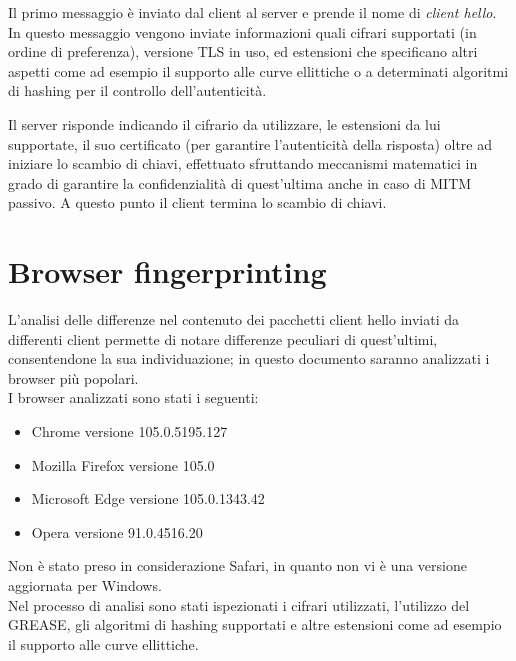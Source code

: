 Il primo messaggio è inviato dal client al server e prende il nome di \textit{client hello}. In questo messaggio vengono inviate informazioni quali cifrari supportati (in ordine di preferenza), versione TLS in uso, ed estensioni che specificano altri aspetti come ad esempio il supporto alle curve ellittiche o a determinati algoritmi di hashing per il controllo dell'autenticità.

Il server risponde indicando il cifrario da utilizzare, le estensioni da lui supportate, il suo certificato (per garantire l'autenticità della risposta) oltre ad iniziare lo scambio di chiavi, effettuato sfruttando meccanismi matematici in grado di garantire la confidenzialità di quest'ultima anche in caso di MITM passivo.
A questo punto il client termina lo scambio di chiavi.

\section{Browser fingerprinting}
L'analisi delle differenze nel contenuto dei pacchetti client hello inviati da differenti client permette di notare differenze peculiari di quest'ultimi, consentendone la sua individuazione; in questo documento saranno analizzati i browser più popolari.
\\

I browser analizzati sono stati i seguenti:
\begin{itemize}
	\item Chrome versione 105.0.5195.127
	\item Mozilla Firefox versione 105.0
	\item Microsoft Edge versione 105.0.1343.42
	\item Opera versione 91.0.4516.20
\end{itemize}
Non è stato preso in considerazione Safari, in quanto non vi è una versione aggiornata per Windows.
\\

Nel processo di analisi sono stati ispezionati i cifrari utilizzati, l'utilizzo del GREASE, gli algoritmi di hashing supportati e altre estensioni come ad esempio il supporto alle curve ellittiche.

